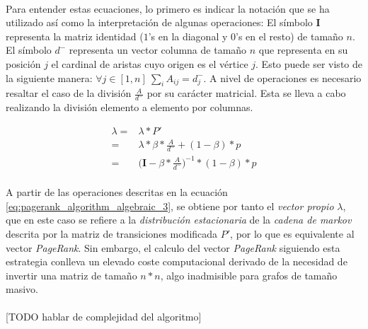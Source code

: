 \documentclass{subfiles}
\begin{document}
        \paragraph{}
        Para entender estas ecuaciones, lo primero es indicar la notación que se ha utilizado así como la interpretación de algunas operaciones: El símbolo $\boldsymbol{I}$ representa la matriz identidad ($1$'s en la diagonal y $0$'s en el resto) de tamaño $n$. El símbolo $d^-$ representa un vector columna de tamaño $n$ que representa en su posición $j$ el cardinal de aristas cuyo origen es el vértice $j$. Esto puede ser visto de la siguiente manera: $\forall j \in [1,n] \ \sum_i A_{ij} = d^{-}_{j}$. A nivel de operaciones es necesario resaltar el caso de la división $\frac{A}{d^-}$ por su carácter matricial. Esta se lleva a cabo realizando la división elemento a elemento por columnas.

        \begin{align}
          \label{eq:pagerank_algorithm_algebraic_1}
          \lambda =& \lambda * P' \\
          \label{eq:pagerank_algorithm_algebraic_2}
                  =& \lambda * \beta * \frac{A}{d^-} + (1-\beta)*p \\
          \label{eq:pagerank_algorithm_algebraic_3}
                  =& \bigg(\boldsymbol{I} - \beta * \frac{A}{d^-}\bigg)^{-1} * (1-\beta)*p
        \end{align}

        \paragraph{}
        A partir de las operaciones descritas en la ecuación \eqref{eq:pagerank_algorithm_algebraic_3}, se obtiene por tanto el \emph{vector propio} $\lambda$, que en este caso se refiere a la \emph{distribución estacionaria} de la \emph{cadena de markov} descrita por la matriz de transiciones modificada $P'$, por lo que es equivalente al vector \emph{PageRank}. Sin embargo, el calculo del vector \emph{PageRank} siguiendo esta estrategia conlleva un elevado coste computacional derivado de la necesidad de invertir una matriz de tamaño $n*n$, algo inadmisible para grafos de tamaño masivo.

        \paragraph{}
        [TODO hablar de complejidad del algoritmo]
\end{document}
